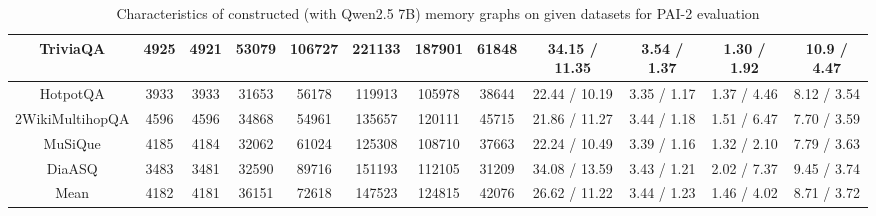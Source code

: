 \begin{table}[H]
{\begin{tabular}{|c|c|ccc|ccc|cccc|}
    TriviaQA & 4925 & \multicolumn{1}{c|}{4921} & \multicolumn{1}{c|}{53079} & 106727 & \multicolumn{1}{c|}{221133} & \multicolumn{1}{c|}{187901} & 61848 & \multicolumn{1}{c|}{34.15 / 11.35} & \multicolumn{1}{c|}{3.54 / 1.37} & \multicolumn{1}{c|}{1.30 / 1.92} & 10.9 / 4.47 \\ \hline
    HotpotQA & 3933 & \multicolumn{1}{c|}{3933} & \multicolumn{1}{c|}{31653} & 56178 & \multicolumn{1}{c|}{119913} & \multicolumn{1}{c|}{105978} & 38644 & \multicolumn{1}{c|}{22.44 / 10.19} & \multicolumn{1}{c|}{3.35 / 1.17} & \multicolumn{1}{c|}{1.37 / 4.46} & 8.12 / 3.54 \\ \hline
    2WikiMultihopQA & 4596 & \multicolumn{1}{c|}{4596} & \multicolumn{1}{c|}{34868} & 54961 & \multicolumn{1}{c|}{135657} & \multicolumn{1}{c|}{120111} & 45715 & \multicolumn{1}{c|}{21.86 / 11.27} & \multicolumn{1}{c|}{3.44 / 1.18} & \multicolumn{1}{c|}{1.51 / 6.47} & 7.70 / 3.59 \\ \hline
    MuSiQue & 4185 & \multicolumn{1}{c|}{4184} & \multicolumn{1}{c|}{32062} & 61024 & \multicolumn{1}{c|}{125308} & \multicolumn{1}{c|}{108710} & 37663 & \multicolumn{1}{c|}{22.24 / 10.49} & \multicolumn{1}{c|}{3.39 / 1.16} & \multicolumn{1}{c|}{1.32 / 2.10} & 7.79 / 3.63 \\ \hline
    DiaASQ & 3483 & \multicolumn{1}{c|}{3481} & \multicolumn{1}{c|}{32590} & 89716 & \multicolumn{1}{c|}{151193} & \multicolumn{1}{c|}{112105} & 31209 & \multicolumn{1}{c|}{34.08 / 13.59} & \multicolumn{1}{c|}{3.43 / 1.21} & \multicolumn{1}{c|}{2.02 / 7.37} & 9.45 / 3.74 \\ \hline \hline
    Mean & 4182 & \multicolumn{1}{c|}{4181} & \multicolumn{1}{c|}{36151} & 72618 & \multicolumn{1}{c|}{147523} & \multicolumn{1}{c|}{124815} & 42076 & \multicolumn{1}{c|}{26.62 / 11.22} & \multicolumn{1}{c|}{3.44 / 1.23} & \multicolumn{1}{c|}{1.46 / 4.02} & 8.71 / 3.72 \\ \hline
    \end{tabular}}
	\renewcommand{\arraystretch}{1}
	\caption{Characteristics of constructed (with Qwen2.5 7B) memory graphs on given datasets for PAI-2 evaluation}
	\label{tab:kg_stats}
\end{table}


